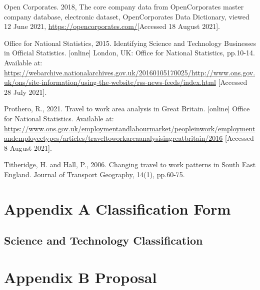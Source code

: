 \documentclass[
  12pt,
  oneside]{book}
\begin{document}
Open Corporates. 2018, The core company data from OpenCorporates master company database, electronic dataset, OpenCorporates Data Dictionary, viewed 12 June 2021, \url{https://opencorporates.com/}{[}Accessed 18 August 2021{]}.

Office for National Statistics, 2015. Identifying Science and Technology Businesses in Official Statistics. {[}online{]} London, UK: Office for National Statistics, pp.10-14. Available at: \url{https://webarchive.nationalarchives.gov.uk/20160105170025/http://www.ons.gov.uk/ons/site-information/using-the-website/rss-news-feeds/index.html} {[}Accessed 28 July 2021{]}.

Prothero, R., 2021. Travel to work area analysis in Great Britain. {[}online{]} Office for National Statistics. Available at: \url{https://www.ons.gov.uk/employmentandlabourmarket/peopleinwork/employmentandemployeetypes/articles/traveltoworkareaanalysisingreatbritain/2016} {[}Accessed 8 August 2021{]}.

Titheridge, H. and Hall, P., 2006. Changing travel to work patterns in South East England. Journal of Transport Geography, 14(1), pp.60-75.

\printbibliography

\hypertarget{appendix-a-classification-form}{%
\chapter*{Appendix A Classification Form}\label{appendix-a-classification-form}}


\hypertarget{science-and-technology-classification}{%
\section*{Science and Technology Classification}\label{science-and-technology-classification}}

\hypertarget{appendix-b-proposal}{%
\chapter*{Appendix B Proposal}\label{appendix-b-proposal}}

\enddocument

\printbibliography
\end{document}
